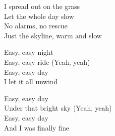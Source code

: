 \begin{lyrics}
I spread out on the grass\\
Let the whole day slow\\
No alarms, no rescue\\
Just the skyline, warm and slow

Easy, easy night\\
Easy, easy ride
(Yeah, yeah)\\
Easy, easy day\\
I let it all unwind

Easy, easy day\\
Under that bright sky
(Yeah, yeah)\\
Easy, easy day\\
And I was finally fine
\end{lyrics}

